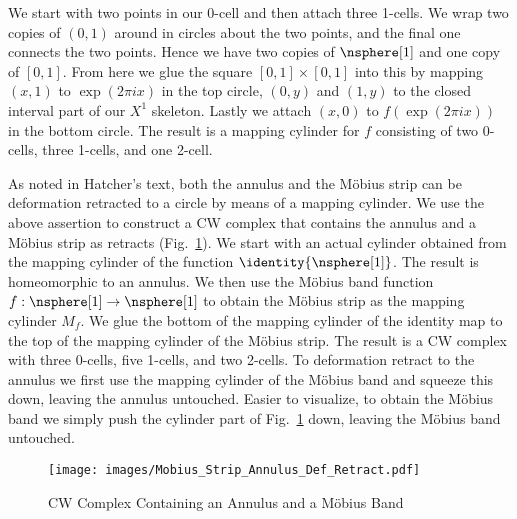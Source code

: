\documentclass{book}                                                           %
\begin{document}
        \begin{solution}
            We start with two points in our 0-cell and then attach three 1-cells.
            We wrap two copies of $(0,1)$ around in circles about the two points,
            and the final one connects the two points. Hence we have two copies of
            $\nsphere[1]$ and one copy of $[0,1]$. From here we glue the square
            $[0,1]\times[0,1]$ into this by mapping $(x,1)$ to $\exp(2\pi{i}x)$ in
            the top circle, $(0,y)$ and $(1,y)$ to the closed interval part of our
            $X^{1}$ skeleton. Lastly we attach $(x,0)$ to $f(\exp(2\pi{i}x))$ in
            the bottom circle. The result is a mapping cylinder for $f$ consisting
            of two 0-cells, three 1-cells, and one 2-cell.
            \par\hfill\par
            As noted in Hatcher's text, both the annulus and the M\"{o}bius strip
            can be deformation retracted to a circle by means of a mapping cylinder.
            We use the above assertion to construct a CW complex that contains the
            annulus and a M\"{o}bius strip as retracts
            (Fig.~\ref{fig:CW_Comp_Annulus_Mobius}). We start with an actual
            cylinder obtained from the mapping cylinder of the function
            $\identity{\nsphere[1]}$. The result is homeomorphic to an annulus. We
            then use the M\"{o}bius band function
            $f:\nsphere[1]\rightarrow\nsphere[1]$ to obtain the M\"{o}bius strip as
            the mapping cylinder $M_{f}$. We glue the bottom of the mapping cylinder
            of the identity map to the top of the mapping cylinder of the M\"{o}bius
            strip. The result is a CW complex with three 0-cells, five 1-cells, and
            two 2-cells. To deformation retract to the annulus we first use the
            mapping cylinder of the M\"{o}bius band and squeeze this down, leaving
            the annulus untouched. Easier to visualize, to obtain the M\"{o}bius
            band we simply push the cylinder part of
            Fig.~\ref{fig:CW_Comp_Annulus_Mobius} down, leaving the M\"{o}bius band
            untouched.
        \end{solution}
        \begin{figure}[H]
            \centering
            \captionsetup{type=figure}
            \texttt{[image: images/Mobius\_Strip\_Annulus\_Def\_Retract.pdf]}
            \caption{CW Complex Containing an Annulus and a M\"{o}bius Band}
            \label{fig:CW_Comp_Annulus_Mobius}
        \end{figure}
\end{document}
